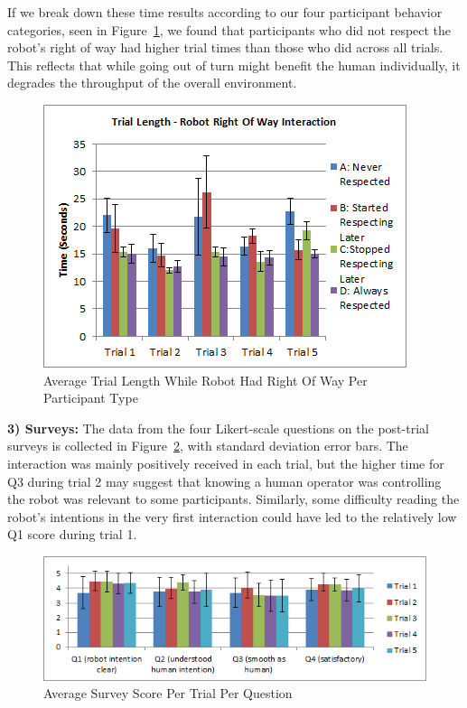 \documentclass[letterpaper, 10 pt, conference]{ieeeconf}  %
\begin{document}
If we break down these time results according to our four participant behavior categories, seen in Figure~\ref{fig:Respect}, we found that participants who did not respect the robot's right of way had higher trial times than those who did across all trials. This reflects that while going out of turn might benefit the human individually, it degrades the throughput of the overall environment. 

     \begin{figure}
      \centering
      \includegraphics{Robot_right.png}
      \caption{Average Trial Length While Robot Had Right Of Way Per Participant Type}
      \label{fig:Respect}
   \end{figure}

\textbf{3) Surveys:} The data from the four Likert-scale questions on the post-trial surveys is collected in Figure~\ref{fig:Questionnaire}, with standard deviation error bars. The interaction was mainly positively received in each trial, but the higher time for Q3 during trial 2 may suggest that knowing a human operator was controlling the robot was relevant to some participants. Similarly, some difficulty reading the robot's intentions in the very first interaction could have led to the relatively low Q1 score during trial 1.
 
     \begin{figure}
      \centering
      \includegraphics[width=\textwidth]{Questionnaire.png}
      \caption{Average Survey Score Per Trial Per Question }
      \label{fig:Questionnaire}
   \end{figure}
 
\end{document}
